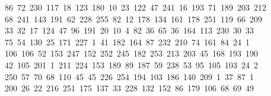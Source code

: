 \begin{tabbing}
\>\ 86\ 72\ 230\ 117\ 18\ 123\ 180\ 10\ 23\ 122\ 47\ 241\ 16\ 193\ 71\ 189\ 203\ 212\\[0pt]
\>\ 68\ 241\ 143\ 191\ 62\ 228\ 255\ 82\ 12\ 178\ 134\ 161\ 178\ 251\ 119\ 66\ 209\\[0pt]
\>\ 33\ 32\ 17\ 124\ 47\ 96\ 191\ 20\ 10\ 4\ 82\ 36\ 65\ 36\ 164\ 113\ 230\ 30\ 33\ \\[0pt]
\ 75\ 54\ 130\ 25\ 171\ 227\ 1\ 41\ 182\ 164\ 87\ 232\ 210\ 74\ 161\ 84\ 24\ 1\\[0pt]
\ 106\ 106\ 52\ 153\ 247\ 152\ 252\ 245\ 182\ 253\ 213\ 203\ 45\ 168\ 193\ 190\\[0pt]
\>\ 42\ 105\ 201\ 1\ 211\ 224\ 153\ 189\ 89\ 187\ 59\ 238\ 53\ 95\ 105\ 103\ 24\ 2\ \\[0pt]
\ 250\ 57\ 70\ 68\ 110\ 45\ 45\ 226\ 254\ 194\ 103\ 186\ 140\ 209\ 1\ 37\ 87\ 1\\[0pt]
\ 200\ 26\ 22\ 216\ 251\ 175\ 137\ 33\ 228\ 132\ 152\ 86\ 179\ 106\ 68\ 69\ 49\ \\[0pt]

\end{tabbing}
